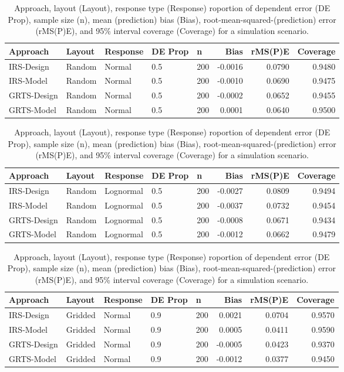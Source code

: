 \documentclass[]{elsarticle} %
\begin{document}
\begin{table}[ht]
\centering
\begin{tabular}{lllllrrr}
  \hline
Approach & Layout & Response & DE Prop & n & Bias & rMS(P)E & Coverage \\ 
  \hline
IRS-Design & Random & Normal & 0.5 & 200 & -0.0016 & 0.0790 & 0.9480 \\ 
  IRS-Model & Random & Normal & 0.5 & 200 & -0.0010 & 0.0690 & 0.9475 \\ 
  GRTS-Design & Random & Normal & 0.5 & 200 & -0.0002 & 0.0652 & 0.9455 \\ 
  GRTS-Model & Random & Normal & 0.5 & 200 & 0.0001 & 0.0640 & 0.9500 \\ 
   \hline
\end{tabular}
\caption{Approach, layout (Layout), response type (Response) roportion of dependent error (DE Prop), sample size (n), mean (prediction) bias (Bias), root-mean-squared-(prediction) error (rMS(P)E), and 95\% interval coverage (Coverage) for a simulation scenario.} 
\end{table}
\begin{table}[ht]
\centering
\begin{tabular}{lllllrrr}
  \hline
Approach & Layout & Response & DE Prop & n & Bias & rMS(P)E & Coverage \\ 
  \hline
IRS-Design & Random & Lognormal & 0.5 & 200 & -0.0027 & 0.0809 & 0.9494 \\ 
  IRS-Model & Random & Lognormal & 0.5 & 200 & -0.0037 & 0.0732 & 0.9454 \\ 
  GRTS-Design & Random & Lognormal & 0.5 & 200 & -0.0008 & 0.0671 & 0.9434 \\ 
  GRTS-Model & Random & Lognormal & 0.5 & 200 & -0.0012 & 0.0662 & 0.9479 \\ 
   \hline
\end{tabular}
\caption{Approach, layout (Layout), response type (Response) roportion of dependent error (DE Prop), sample size (n), mean (prediction) bias (Bias), root-mean-squared-(prediction) error (rMS(P)E), and 95\% interval coverage (Coverage) for a simulation scenario.} 
\end{table}
\begin{table}[ht]
\centering
\begin{tabular}{lllllrrr}
  \hline
Approach & Layout & Response & DE Prop & n & Bias & rMS(P)E & Coverage \\ 
  \hline
IRS-Design & Gridded & Normal & 0.9 & 200 & 0.0021 & 0.0704 & 0.9570 \\ 
  IRS-Model & Gridded & Normal & 0.9 & 200 & 0.0005 & 0.0411 & 0.9590 \\ 
  GRTS-Design & Gridded & Normal & 0.9 & 200 & -0.0005 & 0.0423 & 0.9370 \\ 
  GRTS-Model & Gridded & Normal & 0.9 & 200 & -0.0012 & 0.0377 & 0.9450 \\ 
   \hline
\end{tabular}
\caption{Approach, layout (Layout), response type (Response) roportion of dependent error (DE Prop), sample size (n), mean (prediction) bias (Bias), root-mean-squared-(prediction) error (rMS(P)E), and 95\% interval coverage (Coverage) for a simulation scenario.} 
\end{table}
\end{document}
